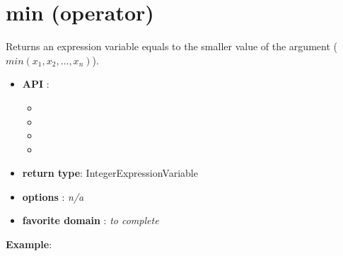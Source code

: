 
\section{min (operator)}\label{min:minoperator}\hypertarget{min:minoperator}{}
Returns an expression variable equals to the smaller value of the argument (\(min(x_1, x_2, ..., x_n)\)).

\begin{itemize}
	\item \textbf{API} :
	\begin{itemize}
		\item {}
		\item {}
		\item {}
		\item {}
	\end{itemize}
	\item \textbf{return type}: IntegerExpressionVariable
	\item \textbf{options} : \emph{n/a}
	\item \textbf{favorite domain} : \emph{to complete}
\end{itemize}

\textbf{Example}:



